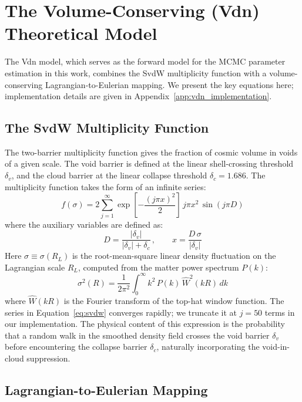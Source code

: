 \documentclass[12pt]{report}
\begin{document}
\section{The Volume-Conserving (Vdn) Theoretical Model}
\label{sec:vdn_model}

The Vdn model, which serves as the forward model for the MCMC parameter estimation in this work, combines the SvdW multiplicity function with a volume-conserving Lagrangian-to-Eulerian mapping. We present the key equations here; implementation details are given in Appendix~\ref{app:vdn_implementation}.

\subsection{The SvdW Multiplicity Function}

The \citet{Sheth2004} two-barrier multiplicity function gives the fraction of cosmic volume in voids of a given scale. The void barrier is defined at the linear shell-crossing threshold $\delta_v$, and the cloud barrier at the linear collapse threshold $\delta_c = 1.686$. The multiplicity function takes the form of an infinite series:
\begin{equation}
    f(\sigma) = 2 \sum_{j=1}^{\infty} \exp\!\left[-\frac{(j\pi x)^2}{2}\right]\, j\pi x^2 \,\sin(j\pi D)
    \label{eq:svdw}
\end{equation}
where the auxiliary variables are defined as:
\begin{equation}
    D = \frac{|\delta_v|}{|\delta_v| + \delta_c}\,, \qquad
    x = \frac{D\,\sigma}{|\delta_v|}
\end{equation}
Here $\sigma \equiv \sigma(R_L)$ is the root-mean-square linear density fluctuation on the Lagrangian scale $R_L$, computed from the matter power spectrum $P(k)$:
\begin{equation}
    \sigma^2(R) = \frac{1}{2\pi^2}\int_0^\infty k^2\,P(k)\,\hat{W}^2(kR)\,dk
    \label{eq:sigma_R}
\end{equation}
where $\hat{W}(kR)$ is the Fourier transform of the top-hat window function. The series in Equation~\ref{eq:svdw} converges rapidly; we truncate it at $j=50$ terms in our implementation. The physical content of this expression is the probability that a random walk in the smoothed density field crosses the void barrier $\delta_v$ before encountering the collapse barrier $\delta_c$, naturally incorporating the void-in-cloud suppression.

\subsection{Lagrangian-to-Eulerian Mapping}
\end{document}
